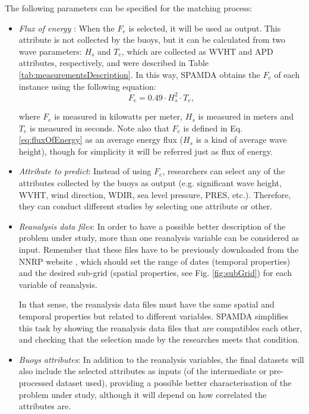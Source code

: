 \documentclass[review]{elsarticle}
\begin{document}
				The following parameters can be specified for the matching process:
				\begin{itemize}
				
					\item \textit{Flux of energy} \cite{FERNANDEZ201544}: When the $F_e$ is selected, it will be used as output. This attribute is not collected by the buoys, but it can be calculated from two wave parameters: $H_s$ and $T_e$, which are collected as WVHT and APD attributes, respectively, and were described in Table \ref{tab:measurementsDescription}. In this way, SPAMDA obtains the $F_e$ of each instance using the following equation:
					\begin{equation}
							F_e = 0.49 \cdot H^2_s \cdot T_e,
							\label{eq:fluxOfEnergy}
					\end{equation}
						
					where $F_e$ is measured in kilowatts per meter, $H_s$ is measured in meters and $T_e$ is measured in seconds. Note also that $F_e$ is defined in Eq. \ref{eq:fluxOfEnergy} as an average energy flux ($H_s$ is a kind of average wave height), though for simplicity it will be referred just as flux of energy.
					
					\item \textit{Attribute to predict}: Instead of using $F_e$, researchers can select any of the attributes collected by the buoys as output (e.g. significant wave height, WVHT, wind direction, WDIR, sea level pressure, PRES, etc.). Therefore, they can conduct different studies by selecting one attribute or other.

					\item \textit{Reanalysis data files}: In order to have a possible better description of the problem under study, more than one reanalysis variable can be considered as input. Remember that these files have to be previously downloaded from the NNRP website \cite{NNRP}, which should set the range of dates (temporal properties) and the desired sub-grid (spatial properties, see Fig. \ref{fig:subGrid}) for each variable of reanalysis.
					
					In that sense, the reanalysis data files must have the same spatial and temporal properties but related to different variables. SPAMDA simplifies this task by showing the reanalysis data files that are compatibles each other, and checking that the selection made by the researches meets that condition.
					
					\item \textit{Buoys attributes}: In addition to the reanalysis variables, the final datasets will also include the selected attributes as inputs (of the intermediate or pre-processed dataset used), providing a possible better characterisation of the problem under study, although it will depend on how correlated the attributes are.


\end{itemize}
\end{document}
